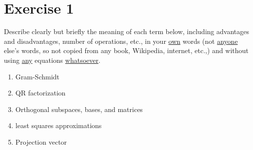 \section{Exercise 1}
Describe clearly but briefly the meaning of each term below, including
advantages and disadvantages, number of operations, etc.,  in your
\underline{own} words (not \underline{anyone} else's words, so not copied
from any book, Wikipedia, internet, etc.,) and without using
\underline{any} equations \underline{whatsoever}.

\begin{enumerate}[label=(\alph*)]
    \item Gram-Schmidt
    \item QR factorization
    \item Orthogonal subspaces, bases, and matrices
    \item least squares approximations
    \item Projection vector
\end{enumerate}

